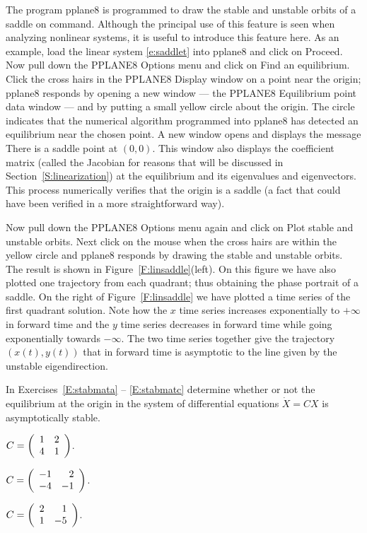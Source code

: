 \documentclass{ximera}
\begin{document}
The program {\sf pplane8} is programmed to draw the stable and unstable
orbits of a saddle on command. Although the principal use of this
feature is seen when analyzing nonlinear systems, it is useful to
introduce this feature here.  As an example, load the linear system
\eqref{e:saddlet} into {\sf pplane8} and click on {\sf Proceed}.  Now
pull down the {\sf PPLANE8 Options} menu and click on {\sf Find an
equilibrium}.  Click the cross hairs in the {\sf PPLANE8 Display}
window on a point near the origin; {\sf pplane8} responds by
opening a new window --- the {\sf PPLANE8 Equilibrium point data}
window --- and by putting a small yellow circle about the
origin.  The circle indicates that the numerical algorithm
programmed into {\sf pplane8} has detected an equilibrium near
the chosen point. A new window opens and displays the message
{\sf There is a saddle point at} $(0,0)$.  This window also displays the
coefficient matrix (called the Jacobian for reasons that will be discussed
in Section~\ref{S:linearization}) at the equilibrium and its eigenvalues
and eigenvectors.  This process numerically verifies that the origin
is a saddle (a fact that could have been verified in a more
straightforward way).

Now pull down the {\sf PPLANE8 Options} menu again and click on
{\sf Plot stable and unstable orbits}.  Next click on the mouse
when the cross hairs are within the yellow circle and {\sf
pplane8} responds by drawing the stable and unstable orbits.
The result is shown in Figure~\ref{F:linsaddle}(left).
On this figure we have also plotted one trajectory
from each quadrant; thus obtaining the phase portrait of a saddle.
On the right of Figure~\ref{F:linsaddle} we have plotted a
time series of the first quadrant solution.  Note how the $x$
time series increases exponentially to $+\infty$ in forward time and 
the $y$ time series decreases in forward time while going exponentially 
towards $-\infty$.  The two time series together
give the trajectory $(x(t),y(t))$ that in forward time is asymptotic
to the line given by the unstable eigendirection.



\EXER

\TEXER


\noindent In Exercises~\ref{E:stabmata} -- \ref{E:stabmatc} determine
whether or not the equilibrium at the origin in the system of differential
equations $\dot{X}=CX$ is asymptotically stable.
\begin{exercise} \label{E:stabmata}
$C=\left(\begin{array}{rr} 1 & 2\\ 4 &1\end{array}\right)$.
\end{exercise}
\begin{exercise} \label{E:stabmatb}
$C=\left(\begin{array}{rr} -1 & 2\\ -4 &-1\end{array}\right)$.
\end{exercise}
\begin{exercise} \label{E:stabmatc}
$C=\left(\begin{array}{rr} 2 & 1\\ 1 &-5\end{array}\right)$.
\end{exercise}
\end{document}
